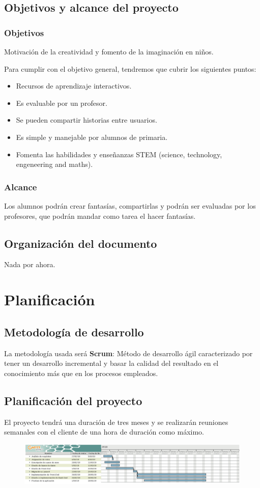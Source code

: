 \documentclass[12pt,letterpaper]{article}
\begin{document}
\subsection{Objetivos y alcance del proyecto}
\subsubsection{Objetivos}
Motivación de la creatividad y fomento de la imaginación en niños.

Para cumplir con el objetivo general, tendremos que cubrir los siguientes puntos:
\begin{itemize}
	\item Recursos de aprendizaje interactivos.
	\item Es evaluable por un profesor.
	\item Se pueden compartir historias entre usuarios.
	\item Es simple y manejable por alumnos de primaria.
	\item Fomenta las habilidades y enseñanzas STEM (science, technology, engeneering and maths).
\end{itemize}

\subsubsection{Alcance}
Los alumnos podrán crear fantasías, compartirlas y podrán ser evaluadas por los profesores, que podrán mandar como tarea el hacer fantasías.

\subsection{Organización del documento}
Nada por ahora.

\newpage
\section{Planificación}
\subsection{Metodología de desarrollo}
La metodología usada será \textbf{Scrum}: Método de desarrollo ágil caracterizado por tener un desarrollo incremental y basar la calidad del resultado en el conocimiento más que en los procesos empleados.

\subsection{Planificación del proyecto}
El proyecto tendrá una duración de tres meses y se realizarán reuniones semanales con el cliente de una hora de duración como máximo.
\begin{figure}[h]
	\centering
	\includegraphics[scale=0.85]{Gantt.pdf}
\end{figure}
\end{document}
